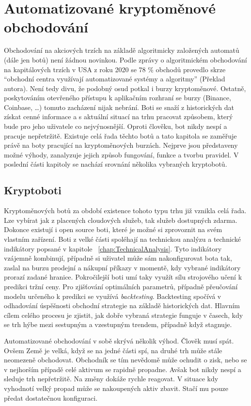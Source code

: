 \chapter{Automatizované kryptoměnové obchodování}
\label{chap:Cryptobots}
Obchodování na akciových trzích na základě algoritmicky založených automatů (dále jen botů) není žádnou novinkou. Podle zprávy o algoritmickém obchodování na kapitálových trzích v USA z roku 2020
\cite{us-algorithmic-trading-report}
se 78 \% obchodů provedlo skrze \enquote{obchodní centra využívají automatizované systémy a algoritmy} (Překlad autora). Není tedy divu, že podobný osud potkal i burzy
kryptoměnové. Ostatně, poskytováním otevřeného přístupu k aplikačním rozhraní se burzy (Binance, Coinbase, \ldots) tomuto zacházení nijak nebrání. Boti se snaží z historických
dat získat cenné informace a s aktuální situací na trhu pracovat způsobem, který bude pro jeho uživatele co nejvýnosnější. Oproti člověku, bot nikdy nespí a pracuje
nepřetržitě. Existuje celá řada těchto botů a tato kapitola se zaměřuje právě na boty pracující na kryptoměnových burzách. Nejprve jsou představeny možné výhody,
zanalyzuje jejich způsob fungování, funkce a tvorbu pravidel. V poslední části kapitoly se nachází srovnání několika vybraných kryptobotů.

\section{Kryptoboti}
Kryptoměnových botů za období existence tohoto typu trhu již vznikla celá řada. Lze vybírat jak z placených cloudových služeb, tak služeb dostupných zdarma. Dokonce existují i open
source boti, které je možné si zprovoznit na svém vlastním zařízení. Boti z velké části spoléhají na technickou analýzu a technické indikátory popsané v kapitole
~\ref{chap:TechnicalAnalysis}.
Tyto indikátory vzájemně kombinují, případně si uživatel může sám nakonfigurovat bota tak, zaslal na burzu prodejní a nákupní příkazy v momentě, kdy vybrané indikátory
prorazí zadané hranice. Pokročilejší boti umí taky využít sílu strojového učení k predikci tržní ceny. Pro zjišťování optimálních parametrů, případně přeučování modelu
určeného k predikci se využívá \emph{backtesting}. Backtesting spočívá v odhadování úspěšnosti obchodní strategie na základě historických dat. Hlavním cílem celého procesu
je zjistit, jak dobře vybraná strategie funguje v časech, kdy se trh hýbe mezi sestupným a vzestupným trendem, případně když stagnuje.

Automatizované obchodování v sobě skrývá několik výhod. Člověk musí spát. Ovšem Země je velká, když se na jedné části spí, na druhé trh může stále neomezeně obchodovat.
Obchodník se tím nevědomě může ochudit o zisk, nebo se v nejhorším případě celé aktivum se rapidně propadne. Avšak bot nikdy nespí a sleduje trh nepřetržitě. Na změny
dokáže rychle reagovat. V situace kdy vyhodnotí velký propad může se nakoupených aktiv zbavit. Stačí mu pouze předat dostatečnou konfiguraci.

